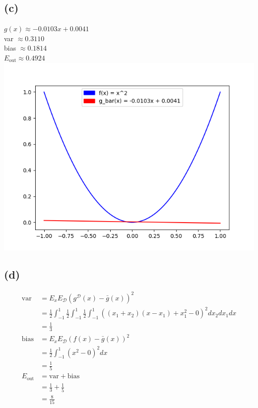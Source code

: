\documentclass{article}
\begin{document}
	\subsection*{(c)}
		$g(x) \approx -0.0103x + 0.0041$\\
		var $\approx 0.3110$\\
		bias $\approx 0.1814$\\
		$E_{\text{out}} \approx 0.4924$\\
		\includegraphics[scale=1]{p2.24c.png}
	
	\subsection*{(d)}
		\begin{align*}
			\text{var} &= E_xE_\mathcal D(g^\mathcal D(x) - \bar g(x))^2\\
			&= \frac12\int_{-1}^1\frac12\int_{-1}^1\frac12\int_{-1}^1((x_1 + x_2)(x - x_1) + x_1^2 - 0)^2 dx_2dx_1dx\\
			&= \boxed{\frac13}\\
			\text{bias} &=  E_xE_\mathcal D(f(x) - \bar g(x))^2\\
			&= \frac12\int_{-1}^1(x^2 - 0)^2 dx\\
			&= \boxed{\frac15}\\
			E_\text{out} &= \text{var} + \text{bias}\\
			&= \frac13 + \frac15\\
			&= \boxed{\frac8{15}}
		\end{align*}
\end{document}
